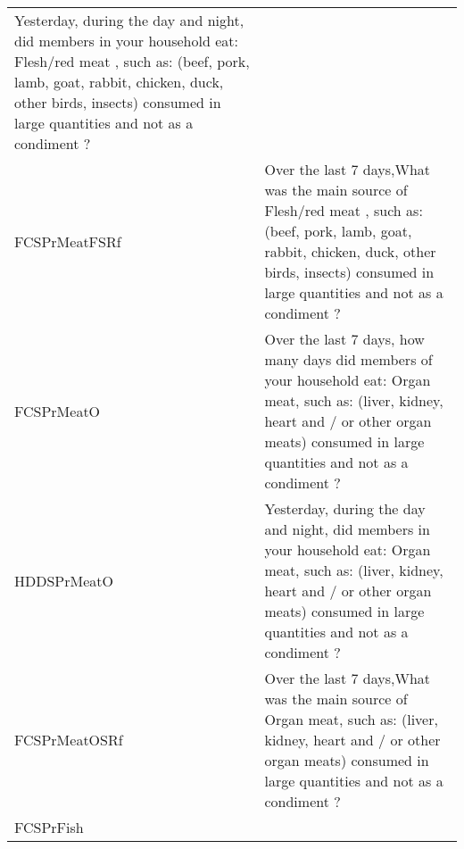 \documentclass[
]{article}
\begin{document}
\begin{longtable}[]{@{}ll@{}}
\begin{minipage}[t]{0.72\columnwidth}
Yesterday, during the day and night, did members in your household eat: Flesh/red meat , such as: (beef, pork, lamb, goat, rabbit, chicken, duck, other birds, insects) consumed in large quantities and not as a condiment ?\strut
\end{minipage}\tabularnewline
\begin{minipage}[t]{0.22\columnwidth}\raggedright
FCSPrMeatFSRf\strut
\end{minipage} & \begin{minipage}[t]{0.72\columnwidth}\raggedright
Over the last 7 days,What was the main source of Flesh/red meat , such as: (beef, pork, lamb, goat, rabbit, chicken, duck, other birds, insects) consumed in large quantities and not as a condiment ?\strut
\end{minipage}\tabularnewline
\begin{minipage}[t]{0.22\columnwidth}\raggedright
FCSPrMeatO\strut
\end{minipage} & \begin{minipage}[t]{0.72\columnwidth}\raggedright
Over the last 7 days, how many days did members of your household eat: Organ meat, such as: (liver, kidney, heart and / or other organ meats) consumed in large quantities and not as a condiment ?\strut
\end{minipage}\tabularnewline
\begin{minipage}[t]{0.22\columnwidth}\raggedright
HDDSPrMeatO\strut
\end{minipage} & \begin{minipage}[t]{0.72\columnwidth}\raggedright
Yesterday, during the day and night, did members in your household eat: Organ meat, such as: (liver, kidney, heart and / or other organ meats) consumed in large quantities and not as a condiment ?\strut
\end{minipage}\tabularnewline
\begin{minipage}[t]{0.22\columnwidth}\raggedright
FCSPrMeatOSRf\strut
\end{minipage} & \begin{minipage}[t]{0.72\columnwidth}\raggedright
Over the last 7 days,What was the main source of Organ meat, such as: (liver, kidney, heart and / or other organ meats) consumed in large quantities and not as a condiment ?\strut
\end{minipage}\tabularnewline
\begin{minipage}[t]{0.22\columnwidth}\raggedright
FCSPrFish\strut
\end{minipage} & \begin{minipage}[t]{0.72\columnwidth}\raggedright

\end{minipage}
\end{longtable}
\end{document}
